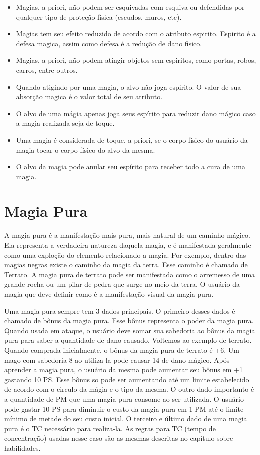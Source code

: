 \begin{itemize}
	\item Magias, a priori, não podem ser esquivadas com esquiva ou defendidas por qualquer tipo de proteção física (escudos, muros, etc).
	\item Magias tem seu efeito reduzido de acordo com o atributo espirito. Espirito é a defesa magica, assim como defesa é a redução de dano fisico.
	\item Magias, a priori, não podem atingir objetos sem espiritos, como portas, robos, carros, entre outros.
	\item Quando atigindo por uma magia, o alvo não joga espirito. O valor de sua absorção magica é o valor total de seu atributo.
	\item O alvo de uma mágia apenas joga seus espírito para reduzir dano mágico caso a magia realizada seja de toque.
	\item Uma magia é considerada de toque, a priori, se o corpo físico do usuário da magia tocar o corpo físico do alvo da mesma.
	\item O alvo da magia pode anular seu espírito para receber todo a cura de uma magia.	
\end{itemize}


\section{Magia Pura}

A magia pura é a manifestação mais pura, mais natural de um caminho mágico. Ela representa a verdadeira natureza daquela magia, e é manifestada geralmente como uma exploção do elemento relacionado a magia. Por exemplo, dentro das magias negras existe o caminho da magia da terra. Esse caminho é chamado de Terrato. A magia pura de terrato pode ser manifestada como o arremesso de uma grande rocha ou um pilar de pedra que surge no meio da terra. O usuário da magia que deve definir como é a manifestação visual da magia pura. 

Uma magia pura sempre tem 3 dados principais. O primeiro desses dados é chamado de bônus da magia pura. Esse bônus representa o poder da magia pura. Quando usada em ataque, o usuário deve somar sua sabedoria ao bônus da magia pura para saber a quantidade de dano causado. Voltemos ao exemplo de terrato. Quando comprada inicialmente, o bônus da magia pura de terrato é +6. Um mago com sabedoria 8 ao utiliza-la pode causar 14 de dano mágico. Após aprender a magia pura, o usuário da mesma pode aumentar seu bônus em +1 gastando 10 PS. Esse bônus so pode ser aumentando até um limite estabelecido de acordo com o circulo da mágia e o tipo da mesma. O outro dado importanto é a quantidade de PM que uma magia pura consome ao ser utilizada. O usuário pode gastar 10 PS para diminuir o custo da magia pura em 1 PM até o limite mínimo de metade do seu custo inicial. O terceiro e último dado de uma magia pura é o TC necessário para realiza-la. As regras para TC (tempo de concentração) usadas nesse caso são as mesmas descritas no capítulo sobre habilidades.

